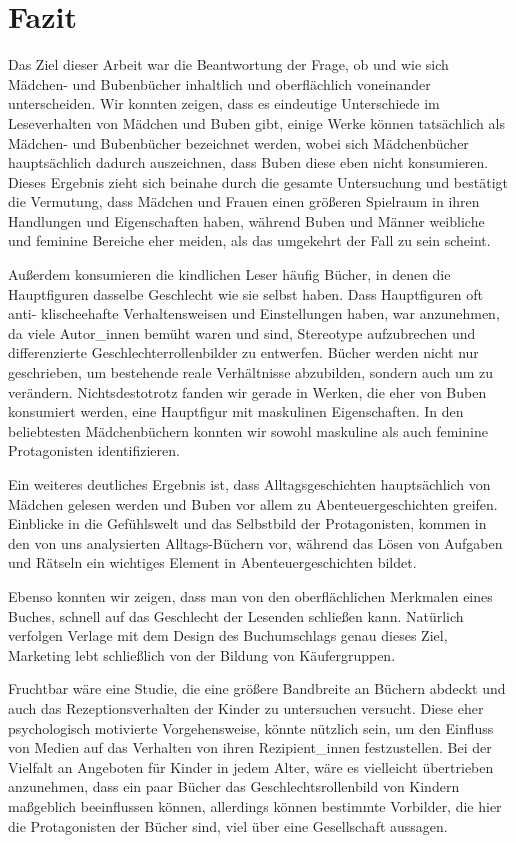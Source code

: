 \chapter{Fazit}

Das Ziel dieser Arbeit war die Beantwortung der Frage, ob und wie sich
Mädchen- und Bubenbücher inhaltlich und oberflächlich voneinander
unterscheiden. Wir konnten zeigen, dass es eindeutige Unterschiede im
Leseverhalten von Mädchen und Buben gibt, einige Werke können
tatsächlich als Mädchen- und Bubenbücher bezeichnet werden, wobei sich
Mädchenbücher hauptsächlich dadurch auszeichnen, dass Buben diese eben
nicht konsumieren. Dieses Ergebnis zieht sich beinahe durch die gesamte
Untersuchung und bestätigt die Vermutung, dass Mädchen und Frauen einen
größeren Spielraum in ihren Handlungen und Eigenschaften haben, während
Buben und Männer weibliche und feminine Bereiche eher meiden, als das
umgekehrt der Fall zu sein scheint.

Außerdem konsumieren die kindlichen Leser häufig Bücher, in denen die
Hauptfiguren dasselbe Geschlecht wie sie selbst haben. Dass Hauptfiguren
oft anti- klischeehafte Verhaltensweisen und Einstellungen haben, war
anzunehmen, da viele Autor\_innen bemüht waren und sind, Stereotype
aufzubrechen und differenzierte Geschlechterrollenbilder zu entwerfen.
Bücher werden nicht nur geschrieben, um bestehende reale Verhältnisse
abzubilden, sondern auch um zu verändern. Nichtsdestotrotz fanden wir
gerade in Werken, die eher von Buben konsumiert werden, eine Hauptfigur
mit maskulinen Eigenschaften. In den beliebtesten Mädchenbüchern konnten
wir sowohl maskuline als auch feminine Protagonisten identifizieren.

Ein weiteres deutliches Ergebnis ist, dass Alltagsgeschichten
hauptsächlich von Mädchen gelesen werden und Buben vor allem zu
Abenteuergeschichten greifen. Einblicke in die Gefühlswelt und das
Selbstbild der Protagonisten, kommen in den von uns analysierten
Alltags-Büchern vor, während das Lösen von Aufgaben und Rätseln ein
wichtiges Element in Abenteuergeschichten bildet.

Ebenso konnten wir zeigen, dass man von den oberflächlichen Merkmalen
eines Buches, schnell auf das Geschlecht der Lesenden schließen kann.
Natürlich verfolgen Verlage mit dem Design des Buchumschlags genau
dieses Ziel, Marketing lebt schließlich von der Bildung von
Käufergruppen.

Fruchtbar wäre eine Studie, die eine größere Bandbreite an Büchern
abdeckt und auch das Rezeptionsverhalten der Kinder zu untersuchen
versucht. Diese eher psychologisch motivierte Vorgehensweise, könnte
nützlich sein, um den Einfluss von Medien auf das Verhalten von ihren
Rezipient\_innen festzustellen. Bei der Vielfalt an Angeboten für Kinder
in jedem Alter, wäre es vielleicht übertrieben anzunehmen, dass ein paar
Bücher das Geschlechtsrollenbild von Kindern maßgeblich beeinflussen
können, allerdings können bestimmte Vorbilder, die hier die
Protagonisten der Bücher sind, viel über eine Gesellschaft aussagen.
